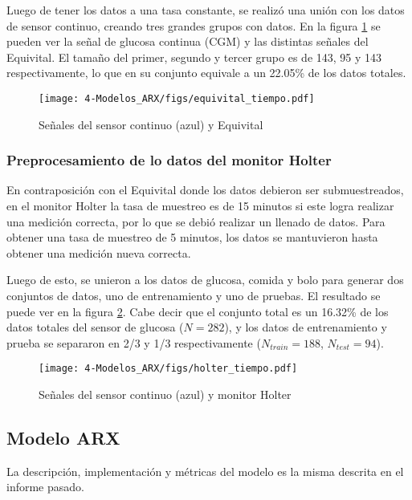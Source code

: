 Luego de tener los datos a una tasa constante, se realizó una unión con los datos de sensor continuo, creando tres grandes grupos con datos. En la figura \ref{fig:equivital_tiempo} se pueden ver la señal de glucosa continua (CGM) y las distintas señales del Equivital. El tamaño del primer, segundo y tercer grupo es de 143, 95 y 143 respectivamente, lo que en su conjunto equivale a un 22.05\% de los datos totales.

\begin{figure}[H]
	\centering
	\texttt{[image: 4-Modelos\_ARX/figs/equivital\_tiempo.pdf]}
	\caption{Señales del sensor continuo (azul) y Equivital}
	\label{fig:equivital_tiempo}
\end{figure}



\subsubsection*{Preprocesamiento de lo datos del monitor Holter}

En contraposición con el Equivital donde los datos debieron ser submuestreados, en el monitor Holter la tasa de muestreo es de 15 minutos si este logra realizar una medición correcta, por lo que se debió realizar un llenado de datos. Para obtener una tasa de muestreo de 5 minutos, los datos se mantuvieron hasta obtener una medición nueva correcta. 

Luego de esto, se unieron a los datos de glucosa, comida y bolo para generar dos conjuntos de datos, uno de entrenamiento y uno de pruebas. El resultado se puede ver en la figura \ref{fig:holter_tiempo}. Cabe decir que el conjunto total es un 16.32\% de los datos totales del sensor de glucosa ($N=282$), y los datos de entrenamiento y prueba se separaron en 2/3 y 1/3 respectivamente ($N_{train} = 188$, $N_{test} = 94$).

\begin{figure}[H]
	\centering
	\texttt{[image: 4-Modelos\_ARX/figs/holter\_tiempo.pdf]}
	\caption{Señales del sensor continuo (azul) y monitor Holter}
	\label{fig:holter_tiempo}
\end{figure}




\subsection{Modelo ARX}

La descripción, implementación y métricas del modelo es la misma descrita en el informe pasado.


